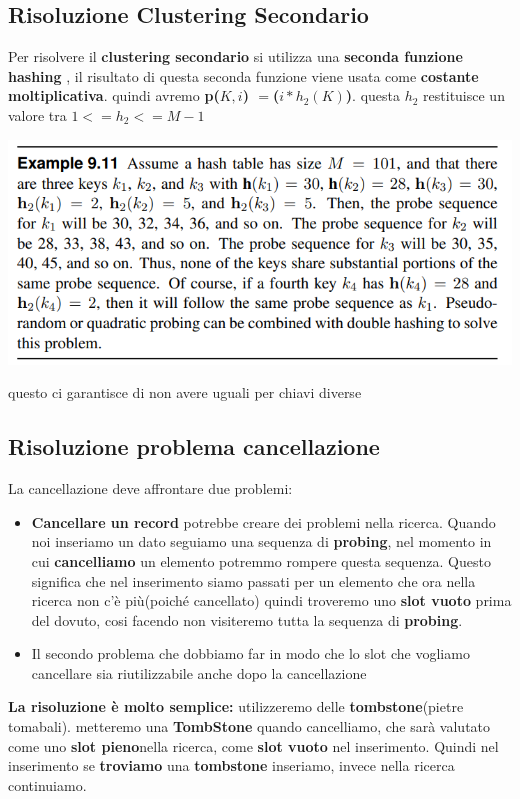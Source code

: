 \subsection{Risoluzione Clustering Secondario}
Per risolvere il\textbf{ clustering secondario} si utilizza una \textbf{seconda funzione hashing} , il risultato di questa seconda funzione viene usata come \textbf{costante moltiplicativa}. quindi avremo \textbf{p($K,i$) $=$($i * h_2(K)$)}. questa $h_2$ restituisce un valore tra $1 <= h_2 <= M-1$
\begin{center}
    \includegraphics[scale = 0.6]{Capitoli/HashTable/Esempi/DoppioHashing.png}
\end{center}
questo ci garantisce di non avere \textbf{\textcolor{blue}{}} uguali per chiavi diverse

\subsection{Risoluzione problema cancellazione}
La cancellazione deve affrontare due problemi:
\begin{itemize}
    \item \textbf{Cancellare un record} potrebbe creare dei problemi nella ricerca. Quando noi inseriamo un dato seguiamo una sequenza di \textbf{probing}, nel momento in cui \textbf{cancelliamo} un elemento potremmo rompere questa sequenza. Questo significa che nel inserimento siamo passati per un elemento che ora nella ricerca non c'è più(poiché cancellato) quindi troveremo uno \textbf{slot vuoto} prima del dovuto, cosi facendo non visiteremo tutta la sequenza di \textbf{probing}.
    \item  Il secondo problema che dobbiamo far in modo che lo slot che vogliamo cancellare sia riutilizzabile anche dopo la cancellazione 
\end{itemize}
\textbf{La risoluzione è molto semplice:} utilizzeremo delle \textbf{tombstone}(pietre tomabali). metteremo una \textbf{TombStone} quando cancelliamo, che sarà valutato come uno \textbf{slot pieno}nella ricerca, come \textbf{slot vuoto} nel inserimento. Quindi nel inserimento se \textbf{troviamo} una \textbf{tombstone} inseriamo, invece nella ricerca continuiamo.
\newpage

